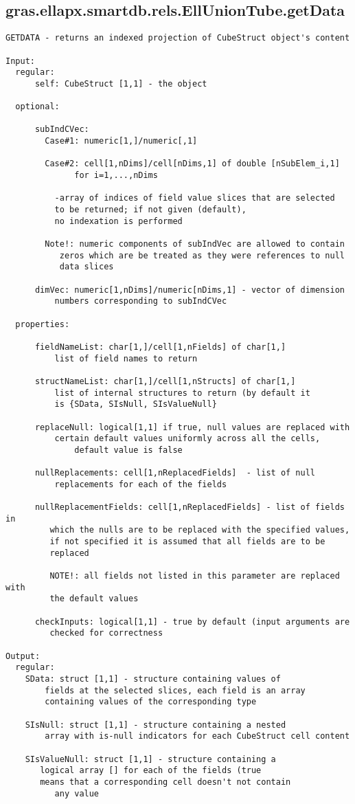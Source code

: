 \subsection{\texorpdfstring{gras.ellapx.smartdb.rels.EllUnionTube.getData}{getData}}\label{method:gras.ellapx.smartdb.rels.EllUnionTube.getData}
\begin{verbatim}
GETDATA - returns an indexed projection of CubeStruct object's content

Input:
  regular:
      self: CubeStruct [1,1] - the object

  optional:

      subIndCVec:
        Case#1: numeric[1,]/numeric[,1]

        Case#2: cell[1,nDims]/cell[nDims,1] of double [nSubElem_i,1]
              for i=1,...,nDims

          -array of indices of field value slices that are selected
          to be returned; if not given (default),
          no indexation is performed

        Note!: numeric components of subIndVec are allowed to contain
           zeros which are be treated as they were references to null
           data slices

      dimVec: numeric[1,nDims]/numeric[nDims,1] - vector of dimension
          numbers corresponding to subIndCVec

  properties:

      fieldNameList: char[1,]/cell[1,nFields] of char[1,]
          list of field names to return

      structNameList: char[1,]/cell[1,nStructs] of char[1,]
          list of internal structures to return (by default it
          is {SData, SIsNull, SIsValueNull}

      replaceNull: logical[1,1] if true, null values are replaced with
          certain default values uniformly across all the cells,
              default value is false

      nullReplacements: cell[1,nReplacedFields]  - list of null
          replacements for each of the fields

      nullReplacementFields: cell[1,nReplacedFields] - list of fields in
         which the nulls are to be replaced with the specified values,
         if not specified it is assumed that all fields are to be
         replaced

         NOTE!: all fields not listed in this parameter are replaced with
         the default values

      checkInputs: logical[1,1] - true by default (input arguments are
         checked for correctness

Output:
  regular:
    SData: struct [1,1] - structure containing values of
        fields at the selected slices, each field is an array
        containing values of the corresponding type

    SIsNull: struct [1,1] - structure containing a nested
        array with is-null indicators for each CubeStruct cell content

    SIsValueNull: struct [1,1] - structure containing a
       logical array [] for each of the fields (true
       means that a corresponding cell doesn't not contain
          any value
\end{verbatim}
